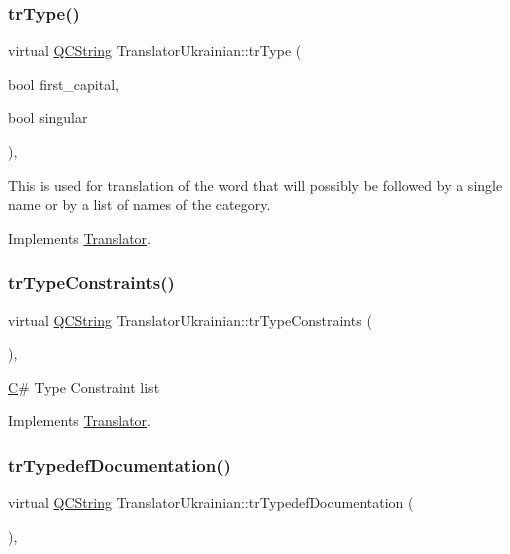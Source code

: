 \subsubsection{\texorpdfstring{trType()}{trType()}}
{\footnotesize\ttfamily virtual \mbox{\hyperlink{class_q_c_string}{Q\+C\+String}} Translator\+Ukrainian\+::tr\+Type (\begin{DoxyParamCaption}\item[{bool}]{first\+\_\+capital,  }\item[{bool}]{singular }\end{DoxyParamCaption})\hspace{0.3cm}{\ttfamily [inline]}, {\ttfamily [virtual]}}

This is used for translation of the word that will possibly be followed by a single name or by a list of names of the category. 

Implements \mbox{\hyperlink{class_translator}{Translator}}.

\mbox{\label{class_translator_ukrainian_a0221d27aa2efd7f76d5f94e9fcbdd29a}} 
\subsubsection{\texorpdfstring{trTypeConstraints()}{trTypeConstraints()}}
{\footnotesize\ttfamily virtual \mbox{\hyperlink{class_q_c_string}{Q\+C\+String}} Translator\+Ukrainian\+::tr\+Type\+Constraints (\begin{DoxyParamCaption}{ }\end{DoxyParamCaption})\hspace{0.3cm}{\ttfamily [inline]}, {\ttfamily [virtual]}}

\mbox{\hyperlink{class_c}{C}}\# Type Constraint list 

Implements \mbox{\hyperlink{class_translator}{Translator}}.

\mbox{\label{class_translator_ukrainian_a76e0c97445005fe813f6a70281590917}} 
\subsubsection{\texorpdfstring{trTypedefDocumentation()}{trTypedefDocumentation()}}
{\footnotesize\ttfamily virtual \mbox{\hyperlink{class_q_c_string}{Q\+C\+String}} Translator\+Ukrainian\+::tr\+Typedef\+Documentation (\begin{DoxyParamCaption}{ }\end{DoxyParamCaption})\hspace{0.3cm}{\ttfamily [inline]}, {\ttfamily [virtual]}}

